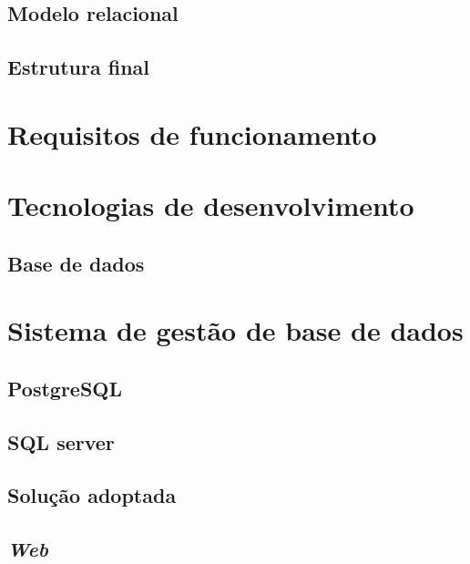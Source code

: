 \subsection{Modelo relacional}


\subsection{Estrutura final}


\newpage

\section{Requisitos de funcionamento}



\section{Tecnologias de desenvolvimento}



\subsection{Base de dados}



\section{Sistema de gestão de base de dados}


\subsection{PostgreSQL}


\subsection{SQL server}



\subsection{Solução adoptada}




\subsection{\textit{Web}}




